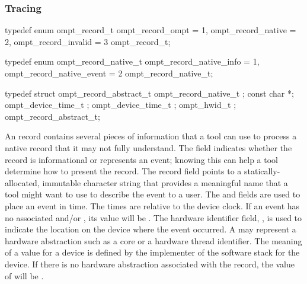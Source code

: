 \subsubsection{Tracing}
\label{sec:ompt-records}


\begin{ccppspecific}
\begin{omptEnum}
typedef enum ompt_record_t {
  ompt_record_ompt               = 1,
  ompt_record_native             = 2,
  ompt_record_invalid            = 3
} ompt_record_t;
\end{omptEnum}
\end{ccppspecific}


\label{sec:ompt_record_native_t}


\begin{ccppspecific}
\begin{omptEnum}
typedef enum ompt_record_native_t {
  ompt_record_native_info  = 1,
  ompt_record_native_event = 2
} ompt_record_native_t;
\end{omptEnum}
\end{ccppspecific}


\label{sec:ompt_record_abstract_t}


\begin{ccppspecific}
\begin{omptRecord}
typedef struct ompt_record_abstract_t {
  ompt_record_native_t ;
  const char *;
  ompt_device_time_t ;
  ompt_device_time_t ;
  ompt_hwid_t ;
} ompt_record_abstract_t;
\end{omptRecord}
\end{ccppspecific}


\descr

An  record contains several
pieces of information that a tool can use to process a native record
that it may not fully understand. The  field
indicates whether the record is informational
or represents an event; knowing this can help a tool determine
how to present the record. The record  field points to
a statically-allocated, immutable character string that provides
a meaningful name that a tool might want to use to describe the event
to a user. The  and  fields are
used to place an event in time. The times are relative to the device
clock. If an event has no associated  and/or
, its value will be
. The hardware identifier field,
,  is used to indicate the location on the device where
the event occurred. A  may represent a hardware abstraction
such as a core or a hardware thread identifier. The meaning of a 
value for a device is defined by the implementer of the software
stack for the device. If there is no hardware abstraction associated
with the record, the value of 
will be .


